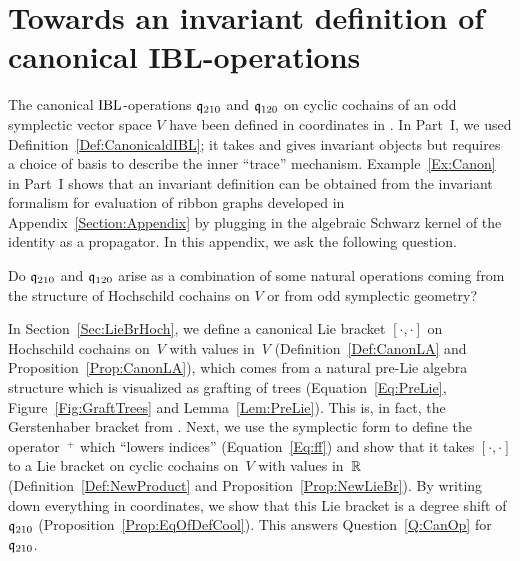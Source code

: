 \documentclass[\MainFolder/Text.tex]{subfiles}
\begin{document}
\chapter{Towards an invariant definition of canonical IBL-operations}
\label{Section:AppEqDefPrCoPr}
\allowdisplaybreaks
{}
The canonical $\mathrm{IBL}$-operations $\mathfrak{q}_{210}$ and $\mathfrak{q}_{120}$ on cyclic cochains of an odd symplectic vector space $V$ have been defined in coordinates in \cite{Cieliebak2015}. In Part~I, we used Definition~\ref{Def:CanonicaldIBL}; it takes and gives invariant objects but requires a choice of basis to describe the inner ``trace'' mechanism. Example~\ref{Ex:Canon} in Part~I shows that an invariant definition can be obtained from the invariant formalism for evaluation of ribbon graphs developed in Appendix~\ref{Section:Appendix} by plugging in the algebraic Schwarz kernel of the identity as a propagator. In this appendix, we ask the following question.
\begin{Question}\label{Q:CanOp}
Do $\mathfrak{q}_{210}$ and $\mathfrak{q}_{120}$ arise as a combination of some natural operations coming from the structure of Hochschild cochains on $V$ or from odd symplectic geometry? 
\end{Question}
In Section~\ref{Sec:LieBrHoch}, we define a canonical Lie bracket $[\cdot,\cdot]$ on Hochschild cochains on~$V$ with values in~$V$ (Definition~\ref{Def:CanonLA} and Proposition~\ref{Prop:CanonLA}), which comes from a natural pre-Lie algebra structure which is visualized as grafting of trees (Equation~\eqref{Eq:PreLie}, Figure~\ref{Fig:GraftTrees} and Lemma~\ref{Lem:PreLie}). This is, in fact, the Gerstenhaber bracket from \cite{Gerstenhaber1963}. Next, we use the symplectic form to define the operator~${}^+$ which ``lowers indices'' (Equation~\ref{Eq:ff}) and show that it takes $[\cdot,\cdot]$ to a Lie bracket on cyclic cochains on~$V$ with values in~$\mathbb{R}$ (Definition~\ref{Def:NewProduct} and Proposition~\ref{Prop:NewLieBr}). By writing down everything in coordinates, we show that this Lie bracket is a degree shift of $\mathfrak{q}_{210}$ (Proposition~\ref{Prop:EqOfDefCool}). This answers Question~\ref{Q:CanOp} for $\mathfrak{q}_{210}$.
\end{document}
